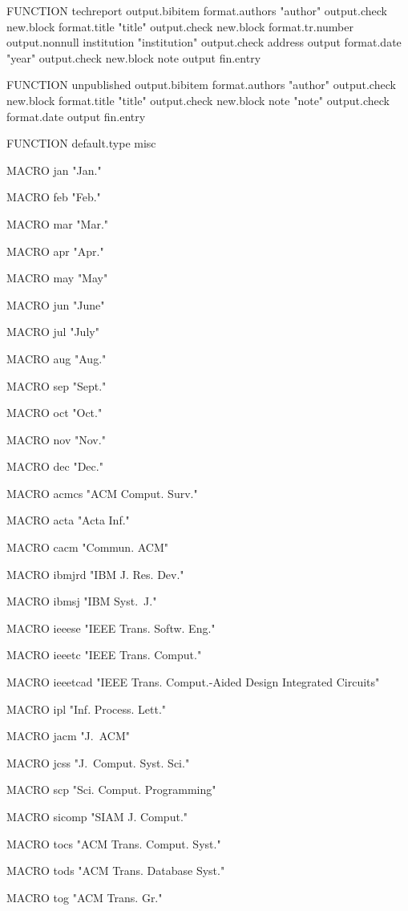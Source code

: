 FUNCTION {techreport}
{ output.bibitem
  format.authors "author" output.check
  new.block
  format.title "title" output.check
  new.block
  format.tr.number output.nonnull
  institution "institution" output.check
  address output
  format.date "year" output.check
  new.block
  note output
  fin.entry
}

FUNCTION {unpublished}
{ output.bibitem
  format.authors "author" output.check
  new.block
  format.title "title" output.check
  new.block
  note "note" output.check
  format.date output
  fin.entry
}

FUNCTION {default.type} { misc }

MACRO {jan} {"Jan."}

MACRO {feb} {"Feb."}

MACRO {mar} {"Mar."}

MACRO {apr} {"Apr."}

MACRO {may} {"May"}

MACRO {jun} {"June"}

MACRO {jul} {"July"}

MACRO {aug} {"Aug."}

MACRO {sep} {"Sept."}

MACRO {oct} {"Oct."}

MACRO {nov} {"Nov."}

MACRO {dec} {"Dec."}

MACRO {acmcs} {"ACM Comput. Surv."}

MACRO {acta} {"Acta Inf."}

MACRO {cacm} {"Commun. ACM"}

MACRO {ibmjrd} {"IBM J. Res. Dev."}

MACRO {ibmsj} {"IBM Syst.~J."}

MACRO {ieeese} {"IEEE Trans. Softw. Eng."}

MACRO {ieeetc} {"IEEE Trans. Comput."}

MACRO {ieeetcad}
 {"IEEE Trans. Comput.-Aided Design Integrated Circuits"}

MACRO {ipl} {"Inf. Process. Lett."}

MACRO {jacm} {"J.~ACM"}

MACRO {jcss} {"J.~Comput. Syst. Sci."}

MACRO {scp} {"Sci. Comput. Programming"}

MACRO {sicomp} {"SIAM J. Comput."}

MACRO {tocs} {"ACM Trans. Comput. Syst."}

MACRO {tods} {"ACM Trans. Database Syst."}

MACRO {tog} {"ACM Trans. Gr."}

